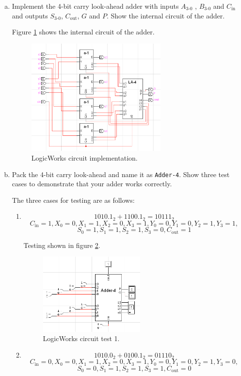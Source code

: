 \documentclass[11pt]{article}
\begin{document}
\begin{enumerate}[(a)]
	\item{
		Implement the 4-bit carry look-ahead adder with inputs $A_{3\text{-}0}$ , $B_{3\text{-}0}$ and $C_{\text{in}}$ and outputs $S_{3\text{-}0}$, $C_{\text{out}}$, $G$ and $P$. Show the internal circuit of the adder.

		Figure \ref{fig:5ac} shows the internal circuit of the adder.

		\begin{figure}[h]
			\centering
			\includegraphics[width=200pt]{5c}
			\caption{\label{fig:5ac} LogicWorks circuit implementation.}
		\end{figure}
	}
	\item{
		Pack the 4-bit carry look-ahead and name it as {\tt Adder-4}. Show three test cases to demonstrate that your adder works correctly.

		The three cases for testing are as follows:
		\begin{enumerate}[1.]
			\item{
				\[
					1010.1_2 + 1100.1_2 = 10111_2
				\]
				\[
					C_{\text{in}} = 1,
					X_0 = 0, X_1 = 1, X_2 = 0, X_3 = 1,
					Y_0 = 0, Y_1 = 0, Y_2 = 1, Y_3 = 1,
				\]
				\[
					S_0 = 1, S_1 = 1, S_2 = 1, S_3 = 0, C_{\text{out}} = 1
				\]

				Testing shown in figure \ref{fig:5t}.

				\begin{figure}[h]
					\centering
					\includegraphics[width=150pt]{5t}
					\caption{\label{fig:5t} LogicWorks circuit test 1.}
				\end{figure}
			}
			\item{
				\[
					1010.0_2 + 0100.1_2 = 01110_2
				\]
				\[
					C_{\text{in}} = 0,
					X_0 = 0, X_1 = 1, X_2 = 0, X_3 = 1,
					Y_0 = 0, Y_1 = 0, Y_2 = 1, Y_3 = 0,
				\]
				\[
					S_0 = 0, S_1 = 1, S_2 = 1, S_3 = 1, C_{\text{out}} = 0
				\]

}
\end{enumerate}}
\end{enumerate}
\end{document}
